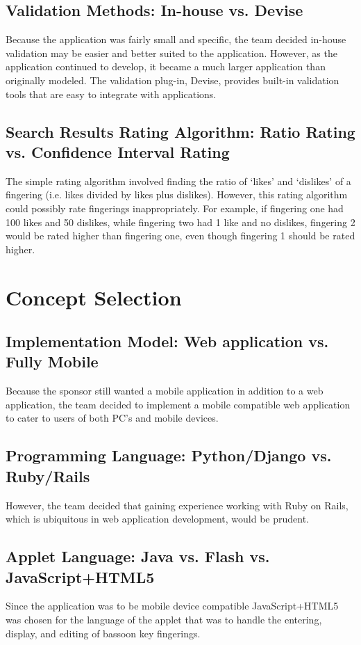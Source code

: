 \documentclass[12pt,english]{article}
\begin{document}
\subsection{Validation Methods: In-house vs. Devise}
Because the application was fairly small and specific, the team decided
in-house validation may be easier and better suited to the application.
However, as the application continued to develop, it became a much
larger application than originally modeled. The validation plug-in,
Devise, provides built-in validation tools that are easy to integrate
with applications.

\subsection{Search Results Rating Algorithm: Ratio Rating vs. Confidence Interval Rating}
The simple rating algorithm involved finding the ratio of `likes'
and `dislikes' of a fingering (i.e. likes divided by likes plus dislikes).
However, this rating algorithm could possibly rate fingerings inappropriately.
For example, if fingering one had 100 likes and 50 dislikes, while
fingering two had 1 like and no dislikes, fingering 2 would be rated
higher than fingering one, even though fingering 1 should be rated
higher.

\section{Concept Selection}
\subsection{Implementation Model: Web application vs. Fully Mobile}
Because the sponsor still wanted a mobile application in addition
to a web application, the team decided to implement a mobile compatible
web application to cater to users of both PC's and mobile devices.

\subsection{Programming Language: Python/Django vs. Ruby/Rails}
However, the team decided that gaining experience working with Ruby
on Rails, which is ubiquitous in web application development, would
be prudent.

\subsection{Applet Language: Java vs. Flash vs. JavaScript+HTML5}
Since the application was to be mobile device compatible JavaScript+HTML5 was
chosen for the language of the applet that was to handle the entering, display, and
editing of bassoon key fingerings.
\end{document}
